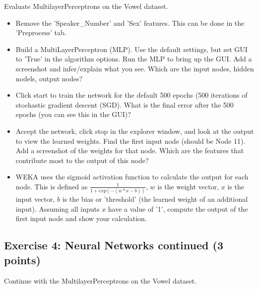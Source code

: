 \documentclass[11pt]{article}
\providecommand{\tightlist}{%
      \setlength{\itemsep}{0pt}\setlength{\parskip}{0pt}}
\begin{document}
Evaluate MultilayerPerceptrons on the Vowel dataset.

\begin{itemize}
\tightlist
\item
  Remove the 'Speaker\_Number' and 'Sex' features. This can be done in
  the 'Preprocess' tab.
\item
  Build a MultiLayerPerceptron (MLP). Use the default settings, but set
  GUI to 'True' in the algorithm options. Run the MLP to bring up the
  GUI. Add a screenshot and infer/explain what you see. Which are the
  input nodes, hidden nodels, output nodes?
\item
  Click start to train the network for the default 500 epochs (500
  iterations of stochastic gradient descent (SGD). What is the final
  error after the 500 epochs (you can see this in the GUI)?
\item
  Accept the network, click stop in the explorer window, and look at the
  output to view the learned weights. Find the first input node (should
  be Node 11). Add a screenshot of the weights for that node. Which are
  the features that contribute most to the output of this node?
\item
  WEKA uses the sigmoid activation function to calculate the output for
  each node. This is defined as \(\frac{1}{1 + exp(-(w*x-b))}\), \(w\)
  is the weight vector, \(x\) is the input vector, \(b\) is the bias or
  'threshold' (the learned weight of an additional input). Assuming all
  inputs \(x\) have a value of '1', compute the output of the first
  input node and show your calculation.
\end{itemize}

    \subsection{Exercise 4: Neural Networks continued (3
points)}\label{exercise-4-neural-networks-continued-3-points}

Continue with the MultilayerPerceptrons on the Vowel dataset.
\end{document}
